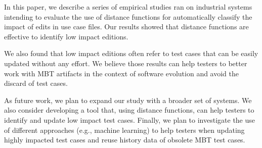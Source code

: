 In this paper, we describe a series of empirical studies ran on industrial systems intending to evaluate the use of distance functions for automatically classify the impact of edits in use case files. Our results showed that distance functions are effective to identify low impact editions. 

We also found that low impact editions often refer to test cases that can be easily updated without any effort. We believe those results can help testers to better work with MBT artifacts in the context of software evolution and avoid the discard of test cases.

As future work, we plan to expand our study with a broader set of systems. We also consider developing a tool that, using distance functions, can help testers to identify and update low impact test cases. Finally, we plan to investigate the use of different approaches (e.g., machine learning) to help testers when updating highly impacted test cases and reuse history data of obsolete MBT test cases.